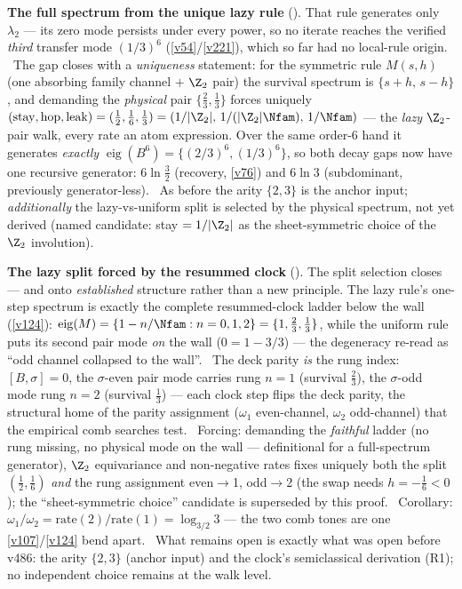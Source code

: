 \par\smallskip\noindent\textbf{The full spectrum from the unique lazy rule}
(). That rule generates only $\lambda_2$ --- its zero mode persists under
every power, so no iterate reaches the verified \emph{third} transfer mode $(1/3)^6$ (\vref{v54}/\vref{v221}),
which so far had no local-rule origin. \mE\ The gap closes with a \emph{uniqueness} statement: for the symmetric
rule $M(s,h)$ (one absorbing family channel $+$ $\Z_2$ pair) the survival spectrum is $\{s{+}h,\,s{-}h\}$, and
demanding the \emph{physical} pair $\{\tfrac23,\tfrac13\}$ forces uniquely
$(\mathrm{stay},\mathrm{hop},\mathrm{leak})=(\tfrac12,\tfrac16,\tfrac13)=(1/|\Z_2|,\,1/(|\Z_2|\Nfam),\,1/\Nfam)$
--- the \emph{lazy} $\Z_2$-pair walk, every rate an atom expression. Over the same order-$6$ hand it generates
\emph{exactly} $\operatorname{eig}(B^6)=\{(2/3)^6,(1/3)^6\}$, so both decay gaps now have one recursive
generator: $6\ln\tfrac32$ (recovery, \vref{v76}) and $6\ln3$ (subdominant, previously generator-less). \mO\ As
before the arity $\{2,3\}$ is the anchor input; \emph{additionally} the lazy-vs-uniform split is selected by the
physical spectrum, not yet derived (named candidate: stay $=1/|\Z_2|$ as the sheet-symmetric choice of the
$\Z_2$ involution).

\par\smallskip\noindent\textbf{The lazy split forced by the resummed clock}
(). The split selection closes --- and onto \emph{established} structure
rather than a new principle. The lazy rule's one-step spectrum is exactly the complete resummed-clock ladder
below the wall (\vref{v124}): $\operatorname{eig}(M)=\{1-n/\Nfam:n=0,1,2\}=\{1,\tfrac23,\tfrac13\}$, while the
uniform rule puts its second pair mode \emph{on} the wall ($0=1-3/3$) --- the degeneracy re-read as ``odd channel
collapsed to the wall''. \mE\ The deck parity \emph{is} the rung index: $[B,\sigma]=0$, the $\sigma$-even pair
mode carries rung $n{=}1$ (survival $\tfrac23$), the $\sigma$-odd mode rung $n{=}2$ (survival $\tfrac13$) ---
each clock step flips the deck parity, the structural home of the parity assignment ($\omega_1$ even-channel,
$\omega_2$ odd-channel) that the empirical comb searches test. \mE\ Forcing: demanding the \emph{faithful} ladder
(no rung missing, no physical mode on the wall --- definitional for a full-spectrum generator), $\Z_2$
equivariance and non-negative rates fixes uniquely both the split $(\tfrac12,\tfrac16)$ \emph{and} the rung
assignment even${}\to{}$1, odd${}\to{}$2 (the swap needs $h=-\tfrac16<0$); the ``sheet-symmetric choice''
candidate is superseded by this proof. \mE\ Corollary: $\omega_1/\omega_2=\mathrm{rate}(2)/\mathrm{rate}(1)
=\log_{3/2}3$ --- the two comb tones are one \vref{v107}/\vref{v124} bend apart. \mO\ What remains open is
exactly what was open before v486: the arity $\{2,3\}$ (anchor input) and the clock's semiclassical derivation
(R1); no independent choice remains at the walk level.

